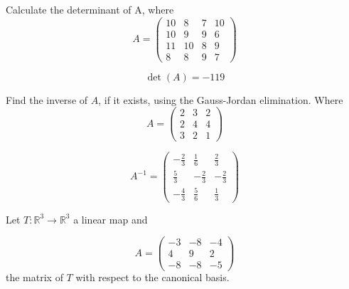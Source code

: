 \begin{questions}

\question Calculate the determinant of A, where
$$
A=\left(\begin{array}{rrrr}
10 & 8 & 7 & 10 \\
10 & 9 & 9 & 6 \\
11 & 10 & 8 & 9 \\
8 & 8 & 9 & 7
\end{array}\right)
$$

\begin{solution}
$$\det(A)=-119$$
\end{solution}

\question Find the inverse of $A$, if it exists, using the Gauss-Jordan elimination. Where
$$
A=\left(\begin{array}{rrr}
2 & 3 & 2 \\
2 & 4 & 4 \\
3 & 2 & 1
\end{array}\right)
$$

\begin{solution}
$$A^{-1}=\left(\begin{array}{rrr}
-\frac{2}{3} & \frac{1}{6} & \frac{2}{3} \\
\frac{5}{3} & -\frac{2}{3} & -\frac{2}{3} \\
-\frac{4}{3} & \frac{5}{6} & \frac{1}{3}
\end{array}\right)$$
\end{solution}

\question Let $T:\mathbb{R}^3\rightarrow\mathbb{R}^3$  a linear map and
 
$$
A=\left(\begin{array}{rrr}
-3 & -8 & -4 \\
4 & 9 & 2 \\
-8 & -8 & -5
\end{array}\right)
$$
the matrix of $T$ with respect to the canonical basis.
\end{questions}
